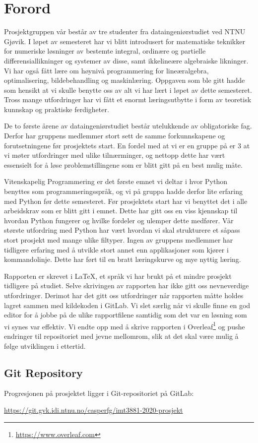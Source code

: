 \section*{Forord}
Prosjektgruppen vår består av tre studenter fra dataingeniørstudiet ved NTNU Gjøvik. I løpet av 
semesteret har vi blitt introdusert for matematiske teknikker for numeriske løsninger av bestemte 
integral, ordinære og partielle differensiallikninger og systemer av disse, samt ikkelineære algebraiske likninger. Vi har også fått lære om høynivå programmering for lineæralgebra, optimalisering, bildebehandling og maskinlæring. Oppgaven som ble gitt hadde som hensikt at vi skulle benytte oss av alt vi har lært i løpet av dette semesteret. Tross mange utfordringer har vi fått et enormt læringsutbytte i form av teoretisk kunnskap og praktiske ferdigheter.

De to første årene av dataingeniørstudiet består utelukkende av obligatoriske fag. Derfor har gruppens medlemmer stort sett de samme forkunnskapene og forutsetningene før prosjektets start. En fordel med at vi er en gruppe på er 3 at vi møter utfordringer med ulike tilnærminger, og nettopp dette har vært essensielt for å løse problemstillingene som er blitt gitt på en best mulig måte.

Vitenskapelig Programmering er det første emnet vi deltar i hvor Python benyttes som programmeringsspråk, og vi på gruppa hadde derfor lite erfaring med Python før dette semesteret. Før prosjektets start har vi benyttet det i alle arbeidskrav som er blitt gitt i emnet. Dette har gitt oss en viss kjennskap til hvordan Python fungerer og hvilke fordeler og ulemper dette medfører. Vår største utfordring med Python har vært hvordan vi skal strukturere et såpass stort prosjekt med mange ulike filtyper. Ingen av gruppens medlemmer har tidligere erfaring med å utvikle stort annet enn applikasjoner som kjører i kommandolinje. Dette har ført til en bratt læringskurve og mye nyttig læring.

Rapporten er skrevet i \LaTeX, et språk vi har brukt på et mindre prosjekt tidligere på studiet. Selve skrivingen av rapporten har ikke gitt oss nevneverdige utfordringer. Derimot har det gitt oss utfordringer når rapporten måtte holdes lagret sammen med kildekoden i GitLab. Vi slet særlig når vi skulle finne en god editor for å jobbe på de ulike rapportfilene samtidig som det var en løsning som vi synes var effektiv. Vi endte opp med å skrive rapporten i Overleaf\footnote{\url{https://www.overleaf.com}} og pushe endringer til repositoriet med jevne mellomrom, slik at det skal være mulig å følge utviklingen i ettertid.

\subsection*{Git Repository}
Progresjonen på prosjektet ligger i Git-repositoriet på GitLab:

\url{https://git.gvk.idi.ntnu.no/casperfg/imt3881-2020-prosjekt}